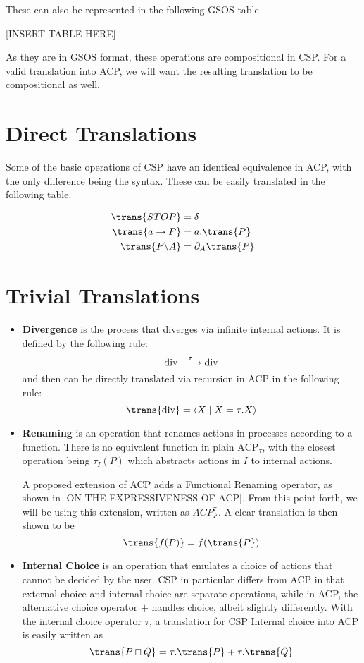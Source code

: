 \documentclass[logo,bsc,singlespacing,parskip,online]{infthesis}
\begin{document}
These can also be represented in the following GSOS table

[INSERT TABLE HERE]

As they are in GSOS format, these operations are compositional in CSP. For a valid translation into ACP, we will want the resulting translation to be compositional as well.

\section{Direct Translations}
Some of the basic operations of CSP have an identical equivalence in ACP, with the only difference being the syntax. These can be easily translated in the following table.

\begin{align*}
   \trans{STOP} &= \delta \\
   \trans{a \to P} &= a.\trans{P} \\
   \trans{P \backslash A} &= \partial_{A}{\trans{P}} \\
\end{align*}

\section{Trivial Translations}
\begin{itemize}
   \item \textbf{Divergence} is the process that diverges via infinite internal actions. It is defined by the following rule:
      \[\mathrm{div} \prightarrow{\tau} \mathrm{div}\]
      and then can be directly translated via recursion in ACP in the following rule:
      \[\trans{\mathrm{div}} = \langle X \mid X = \tau.X \rangle\] 
   \item \textbf{Renaming} is an operation that renames actions in processes according to a function. There is no equivalent function in plain $\mathrm{ACP}_{\tau}$, with the closest operation being $\tau_{I}(P)$ which abstracts actions in $I$ to internal actions.

      A proposed extension of ACP adds a Functional Renaming operator, as shown in [ON THE EXPRESSIVENESS OF ACP]. From this point forth, we will be using this extension, written as $ACP^{\tau}_{F}$. A clear translation is then shown to be
      \[\trans{f(P)} = f(\trans{P})\]
   \item \textbf{Internal Choice} is an operation that emulates a choice of actions that cannot be decided by the user. CSP in particular differs from ACP in that external choice and internal choice are separate operations, while in ACP, the alternative choice operator $+$ handles choice, albeit slightly differently. With the internal choice operator $\tau$, a translation for CSP Internal choice into ACP is easily written as
      \[\trans{P \sqcap Q} = \tau.\trans{P} + \tau.\trans{Q}\]
\end{itemize}
\end{document}

